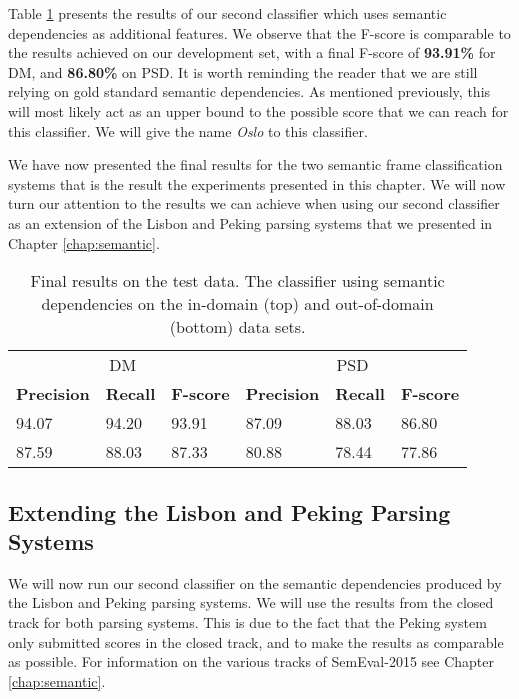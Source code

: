 Table \ref{table:final_results_semantic} presents the results of our second classifier which uses semantic dependencies as additional features. We observe that the F-score is comparable to the results achieved on our development set, with a final F-score of \textbf{93.91\%} for DM, and \textbf{86.80\%} on PSD. It is worth reminding the reader that we are still relying on gold standard semantic dependencies. As mentioned previously, this will most likely act as an upper bound to the possible score that we can reach for this classifier. We will give the name \textit{Oslo} to this classifier.

We have now presented the final results for the two semantic frame classification systems that is the result the experiments presented in this chapter. We will now turn our attention to the results we can achieve when using our second classifier as an extension of the Lisbon and Peking parsing systems that we presented in Chapter \ref{chap:semantic}. 



\begin{table}
    \centering
    \smaller[0.2]
    \begin{tabular}{@{}llllll@{}}
        \toprule
        \multicolumn{3}{c}{DM}
        & \multicolumn{3}{c}{PSD} \\
        \textbf{Precision} & \textbf{Recall} & \textbf{F-score} & \textbf{Precision} & \textbf{Recall} & \textbf{F-score} \\
        \midrule
        94.07 & 94.20 & 93.91 & 87.09 & 88.03 & 86.80 \\
        87.59 & 88.03 & 87.33 & 80.88 & 78.44 & 77.86 \\
        \bottomrule
    \end{tabular}
    \caption{Final results on the test data. The classifier using semantic dependencies on the in-domain (top) and out-of-domain (bottom) data sets.}
    \label{table:final_results_semantic}
\end{table}



 
\subsection{Extending the Lisbon and Peking Parsing Systems}

We will now run our second classifier on the semantic dependencies produced by the Lisbon and Peking parsing systems. We will use the results from the closed track for both parsing systems. This is due to the fact that the Peking system only submitted scores in the closed track, and to make the results as comparable as possible. For information on the various tracks of SemEval-2015 see Chapter \ref{chap:semantic}.


